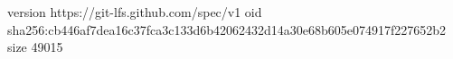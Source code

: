 version https://git-lfs.github.com/spec/v1
oid sha256:cb446af7dea16c37fca3c133d6b42062432d14a30e68b605e074917f227652b2
size 49015
